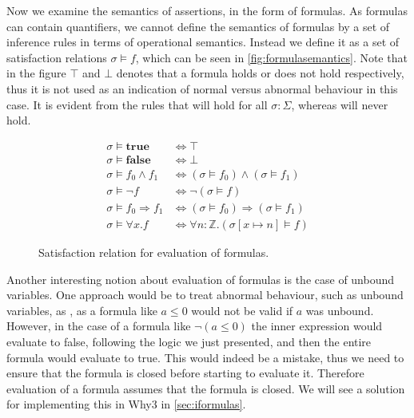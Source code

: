 Now we examine the semantics of assertions, in the form of formulas.
As formulas can contain quantifiers, we cannot define the semantics of formulas by a set
of inference rules in terms of operational semantics.
Instead we define it as a set of satisfaction relations $\sigma \vDash f$, which can be seen in \autoref{fig:formulasemantics}.
Note that in the figure $\top$ and $\bot$ denotes that a formula holds or does not hold
respectively, thus it is not used as an indication of normal versus abnormal behaviour
in this case.
It is evident from the rules that  will hold for all $\sigma: \Sigma$,
whereas  will never hold.

\begin{figure}[h!]
  \begin{align*}
    \sigma \vDash \mathbf{true} &\Longleftrightarrow \top \\
    \sigma \vDash \mathbf{false} &\Longleftrightarrow \bot \\
    \sigma \vDash f_{0} \land f_{1} &\Longleftrightarrow
           (\sigma \vDash f_{0}) \land (\sigma \vDash f_{1}) \\
    \sigma \vDash \neg f &\Longleftrightarrow \neg (\sigma \vDash f) \\
    \sigma \vDash f_{0} \Rightarrow f_{1} &\Longleftrightarrow
           (\sigma \vDash f_{0}) \Rightarrow (\sigma \vDash f_{1}) \\
    \sigma \vDash \forall x.f &\Longleftrightarrow
                                \forall n:\mathbb{Z}. (\sigma [x \mapsto n] \vDash f)
  \end{align*}
\caption{Satisfaction relation for evaluation of formulas.}
\label{fig:formulasemantics}
\end{figure}



Another interesting notion about evaluation of formulas is the case of unbound variables.
One approach would be to treat abnormal behaviour, such as unbound variables, as ,
as a formula like $a \leq 0$ would not be valid if $a$ was unbound.
However, in the case of a formula like $\neg (a \leq 0)$ the inner expression would evaluate to
false, following the logic we just presented, and then the entire formula would evaluate to
true. This would indeed be a mistake, thus we need to ensure that the formula is closed before
starting to evaluate it. Therefore evaluation of a formula assumes that the formula is closed.
We will see a solution for implementing this in Why3 in \ref{sec:iformulas}.
